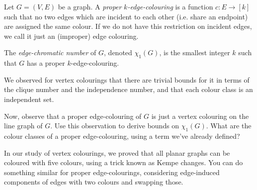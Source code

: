 \documentclass[nobib]{tufte-handout}
\begin{document}
\begin{definition}
    Let $G = (V,E)$ be a graph. A \emph{proper} \emph{$k$-edge-colouring} is a function $c: E \to [k]$ such that no two edges which are incident to each other (i.e. share an endpoint) are assigned the same colour. If we do not have this restriction on incident edges, we call it just an (improper) edge colouring.

    The \emph{edge-chromatic number} of $G$, denoted $\chi_1(G)$, is the smallest integer $k$ such that $G$ has a proper $k$-edge-colouring.
\end{definition}

\begin{xca}
    We observed for vertex colourings that there are trivial bounds for it in terms of the clique number and the independence number, and that each colour class is an independent set.

    Now, observe that a proper edge-colouring of $G$ is just a vertex colouring on the line graph of $G$. Use this observation to derive bounds on $\chi_1(G)$. What are the colour classes of a proper edge-colouring, using a term we've already defined?
\end{xca}

In our study of vertex colourings, we proved that all planar graphs can be coloured with five colours, using a trick known as Kempe changes. You can do something similar for proper edge-colourings, considering edge-induced components of edges with two colours and swapping those.
\end{document}
